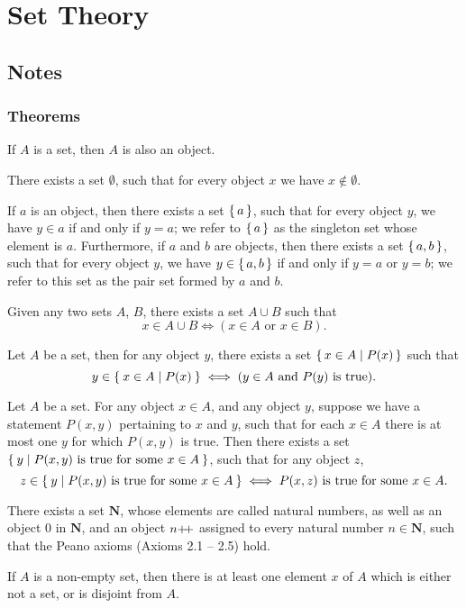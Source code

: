 \section{Set Theory}
\subsection{Notes}
\subsubsection{Theorems}
\begin{axiom}
    If $A$ is a set, then $A$ is also an object.
\end{axiom}
\begin{axiom}
    There exists a set $\emptyset$, such that for every object $x$ we have $x \notin \emptyset$.
\end{axiom}
\begin{axiom}
    If $a$ is an object, then there exists a set $\set{a}$, such that for every object $y$, we have $y\in{a}$ if and only if $y=a$; we refer to $\set{a}$ as the singleton set whose element is $a$. Furthermore, if $a$ and $b$ are objects, then there exists a set $\set{a, b}$, such that for every object $y$, we have $y \in \set{a, b}$ if and only if $y = a$ or $y = b$; we refer to this set as the pair set formed by $a$ and $b$.
\end{axiom}
\begin{axiom}
    Given any two sets $A$, $B$, there exists a set $A \cup B$ such that \[x\in A\cup B \iff (x\in A \text{ or } x\in B).\]
\end{axiom}
\begin{axiom}
    Let $A$ be a set, then for any object $y$, there exists a set $\set{x\in A | P(x)}$ such that \[y\in \Set{x\in A | P(x)} \iff (y\in A \text{ and } P(y) \text{ is true}).\] 
\end{axiom}
\begin{axiom}[Replacement]
    Let $A$ be a set. For any object $x \in A$, and any object $y$, suppose we have a statement $P(x,y)$ pertaining to $x$ and $y$, such that for each $x \in A$ there is at most one $y$ for which $P(x,y)$ is true. Then there exists a set $\Set{y | P (x, y) \text{ is true for some } x \in A}$, such that for any object $z$, \[z \in \Set{y | P(x,y)\text{ is true for some }x \in A} \iff P(x,z)\text{ is true for some }x \in A.\]
\end{axiom}
\begin{axiom}[Infinity]
    There exists a set $\mathbf{N}$, whose elements are called natural numbers, as well as an object $0$ in $\mathbf{N}$, and an object $n{+}{\mkern-4mu}{+}$ assigned to every natural number $n \in \mathbf{N}$, such that the Peano axioms (Axioms 2.1 -- 2.5) hold.
\end{axiom}
\begin{axiom}[Regularity]
    If $A$ is a non-empty set, then there is at least one element $x$ of $A$ which is either not a set, or is disjoint from $A$.
\end{axiom}

